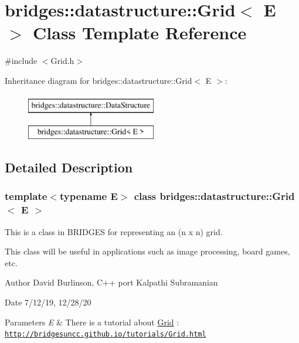 \hypertarget{classbridges_1_1datastructure_1_1_grid}{}\section{bridges\+:\+:datastructure\+:\+:Grid$<$ E $>$ Class Template Reference}
\label{classbridges_1_1datastructure_1_1_grid}


{\ttfamily \#include $<$Grid.\+h$>$}

Inheritance diagram for bridges\+:\+:datastructure\+:\+:Grid$<$ E $>$\+:\begin{figure}[H]
\begin{center}
\leavevmode
\includegraphics[height=2.000000cm]{classbridges_1_1datastructure_1_1_grid}
\end{center}
\end{figure}


\subsection{Detailed Description}
\subsubsection*{template$<$typename E$>$\newline
class bridges\+::datastructure\+::\+Grid$<$ E $>$}

This is a class in B\+R\+I\+D\+G\+ES for representing an (n x n) grid. 

This class will be useful in applications such as image processing, board games, etc.

\begin{DoxyAuthor}{Author}
David Burlinson, C++ port Kalpathi Subramanian 
\end{DoxyAuthor}
\begin{DoxyDate}{Date}
7/12/19, 12/28/20
\end{DoxyDate}

\begin{DoxyParams}{Parameters}
{\em E} & There is a tutorial about \hyperlink{classbridges_1_1datastructure_1_1_grid}{Grid} \+: \href{http://bridgesuncc.github.io/tutorials/Grid.html}{\tt http\+://bridgesuncc.\+github.\+io/tutorials/\+Grid.\+html} \\
\hline
\end{DoxyParams}
